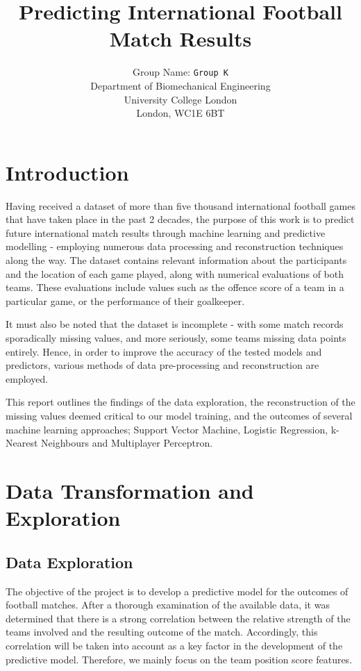 \documentclass[8pt]{article}
\title{Predicting International Football Match Results}
\author{
 Group Name: \texttt{Group K}\\
  Department of Biomechanical Engineering\\
  University College London\\
  London, WC1E 6BT\\
}
\begin{document}
\maketitle



\section{Introduction}
Having received a dataset of more than five thousand international football games that have taken place in the past 2 decades, the purpose of this work is to predict future international match results through machine learning and predictive modelling - employing numerous data processing and reconstruction techniques along the way. The dataset contains relevant information about the participants and the location of each game played, along with numerical evaluations of both teams. These evaluations include values such as the offence score of a team in a particular game, or the performance of their goalkeeper.

It must also be noted that the dataset is incomplete - with some match records sporadically missing values, and more seriously, some teams missing data points entirely. Hence, in order to improve the accuracy of the tested models and predictors, various methods of data pre-processing and reconstruction are employed. 

This report outlines the findings of the data exploration, the reconstruction of the missing values deemed critical to our model training, and the outcomes of several machine learning approaches; Support Vector Machine, Logistic Regression, k-Nearest Neighbours and Multiplayer Perceptron.

\section{Data Transformation and Exploration}
\label{sec:explorationw}
\subsection{Data Exploration}
The objective of the project is to develop a predictive model for the outcomes of football matches. After a thorough examination of the available data, it was determined that there is a strong correlation between the relative strength of the teams involved and the resulting outcome of the match. Accordingly, this correlation will be taken into account as a key factor in the development of the predictive model. 
Therefore, we mainly focus on the team position score features.
\end{document}

